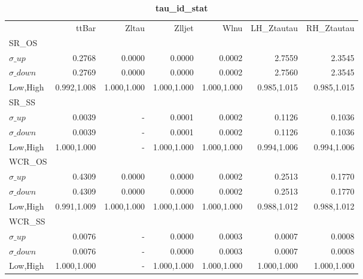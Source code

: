 \documentclass[11pt,oneside,a4paper]{article}
\begin{document}
\begin{table}
\caption{\bf{tau\_id\_stat}}
\centering
\begin{tabular}{lrrrrrr}
& ttBar & Zltau & Zlljet & Wlnu & LH\_Ztautau & RH\_Ztautau \\

SR\_OS &  &  &  &  &  &  \\
$\sigma\_up$ & 0.2768 & 0.0000 & 0.0000 & 0.0002 & 2.7559 & 2.3545 \\
$\sigma\_down$ & 0.2769 & 0.0000 & 0.0000 & 0.0002 & 2.7560 & 2.3545 \\
Low,High & 0.992,1.008 & 1.000,1.000 & 1.000,1.000 & 1.000,1.000 & 0.985,1.015 & 0.985,1.015 \\

\hline
SR\_SS &  &  &  &  &  &  \\
$\sigma\_up$ & 0.0039 & - & 0.0001 & 0.0002 & 0.1126 & 0.1036 \\
$\sigma\_down$ & 0.0039 & - & 0.0001 & 0.0002 & 0.1126 & 0.1036 \\
Low,High & 1.000,1.000 & - & 1.000,1.000 & 1.000,1.000 & 0.994,1.006 & 0.994,1.006 \\

\hline
WCR\_OS &  &  &  &  &  &  \\
$\sigma\_up$ & 0.4309 & 0.0000 & 0.0000 & 0.0002 & 0.2513 & 0.1770 \\
$\sigma\_down$ & 0.4309 & 0.0000 & 0.0000 & 0.0002 & 0.2513 & 0.1770 \\
Low,High & 0.991,1.009 & 1.000,1.000 & 1.000,1.000 & 1.000,1.000 & 0.988,1.012 & 0.988,1.012 \\

\hline
WCR\_SS &  &  &  &  &  &  \\
$\sigma\_up$ & 0.0076 & - & 0.0000 & 0.0003 & 0.0007 & 0.0008 \\
$\sigma\_down$ & 0.0076 & - & 0.0000 & 0.0003 & 0.0007 & 0.0008 \\
Low,High & 1.000,1.000 & - & 1.000,1.000 & 1.000,1.000 & 1.000,1.000 & 1.000,1.000 \\
\end{tabular}
\end{table}
\end{document}
